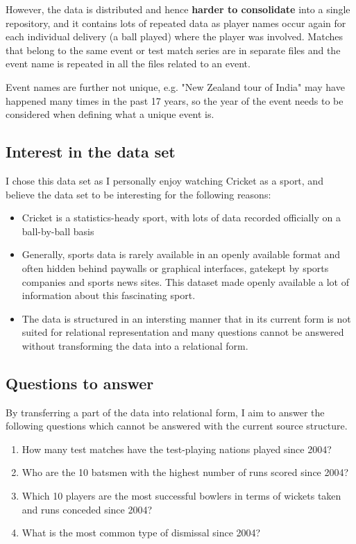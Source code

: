 However, the data is distributed and hence \textbf{harder to consolidate} into a single repository, and it contains lots of repeated data as player names occur again for each individual delivery (a ball played) where the player was involved. Matches that belong to the same event or test match series are in separate files and the event name is repeated in all the files related to an event.

Event names are further not unique, e.g. "New Zealand tour of India" may have happened many times in the past 17 years, so the year of the event needs to be considered when defining what a unique event is.

\subsection{Interest in the data set}

I chose this data set as I personally enjoy watching Cricket as a sport, and believe the data set to be interesting for the following reasons:

\begin{itemize}
    \item Cricket is a statistics-heady sport, with lots of data recorded officially on a ball-by-ball basis
    \item Generally, sports data is rarely available in an openly available format and often hidden behind paywalls or graphical interfaces, gatekept by sports companies and sports news sites. This dataset made openly available a lot of information about this fascinating sport.
    \item The data is structured in an intersting manner that in its current form is not suited for relational representation and many questions cannot be answered without transforming the data into a relational form.
\end{itemize}

\subsection{Questions to answer}

By transferring a part of the data into relational form, I aim to answer the following questions which cannot be answered with the current source structure.

\begin{enumerate}
    \item How many test matches have the test-playing nations played since 2004?
    \item Who are the 10 batsmen with the highest number of runs scored since 2004?
    \item Which 10 players are the most successful bowlers in terms of wickets taken and runs conceded since 2004?
    \item What is the most common type of dismissal since 2004?
\end{enumerate}

